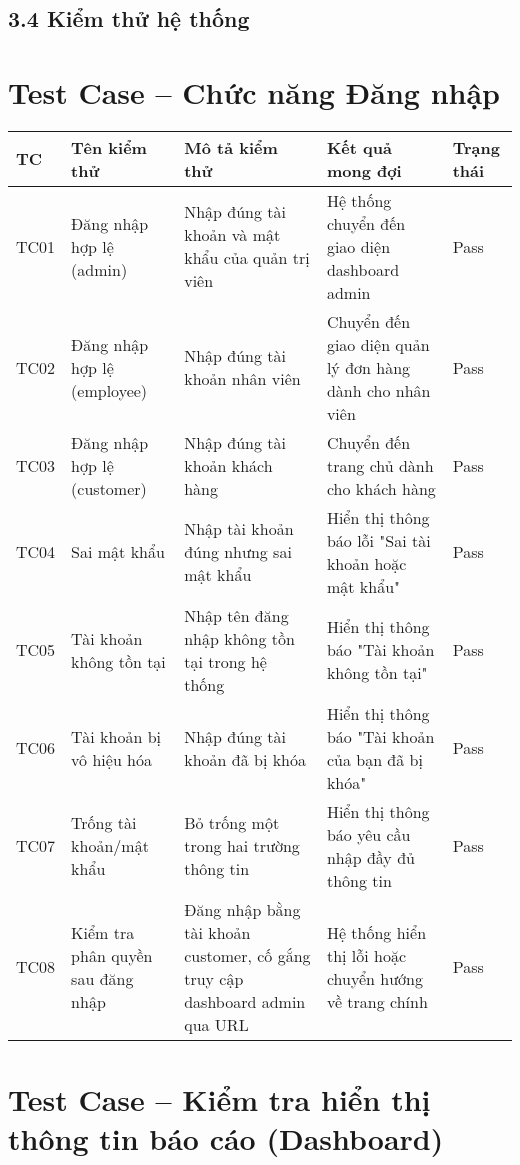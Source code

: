 \subsection*{\textbf{3.4 Kiểm thử hệ thống}}

\section*{Test Case – Chức năng Đăng nhập}

\begin{longtable}{|p{1cm}|p{3cm}|p{4cm}|p{3cm}|p{2cm}|}
\hline
\textbf{TC} & \textbf{Tên kiểm thử} & \textbf{Mô tả kiểm thử} & \textbf{Kết quả mong đợi} & \textbf{Trạng thái} \\
\hline
TC01 & Đăng nhập hợp lệ (admin) & Nhập đúng tài khoản và mật khẩu của quản trị viên & Hệ thống chuyển đến giao diện dashboard admin & Pass \\
\hline
TC02 & Đăng nhập hợp lệ (employee) & Nhập đúng tài khoản nhân viên & Chuyển đến giao diện quản lý đơn hàng dành cho nhân viên & Pass \\
\hline
TC03 & Đăng nhập hợp lệ (customer) & Nhập đúng tài khoản khách hàng & Chuyển đến trang chủ dành cho khách hàng & Pass \\
\hline
TC04 & Sai mật khẩu & Nhập tài khoản đúng nhưng sai mật khẩu & Hiển thị thông báo lỗi "Sai tài khoản hoặc mật khẩu" & Pass \\
\hline
TC05 & Tài khoản không tồn tại & Nhập tên đăng nhập không tồn tại trong hệ thống & Hiển thị thông báo "Tài khoản không tồn tại" & Pass \\
\hline
TC06 & Tài khoản bị vô hiệu hóa & Nhập đúng tài khoản đã bị khóa & Hiển thị thông báo "Tài khoản của bạn đã bị khóa" & Pass \\
\hline
TC07 & Trống tài khoản/mật khẩu & Bỏ trống một trong hai trường thông tin & Hiển thị thông báo yêu cầu nhập đầy đủ thông tin & Pass \\
\hline
TC08 & Kiểm tra phân quyền sau đăng nhập & Đăng nhập bằng tài khoản customer, cố gắng truy cập dashboard admin qua URL & Hệ thống hiển thị lỗi hoặc chuyển hướng về trang chính & Pass \\
\hline
\end{longtable}

\section*{Test Case – Kiểm tra hiển thị thông tin báo cáo (Dashboard)}


